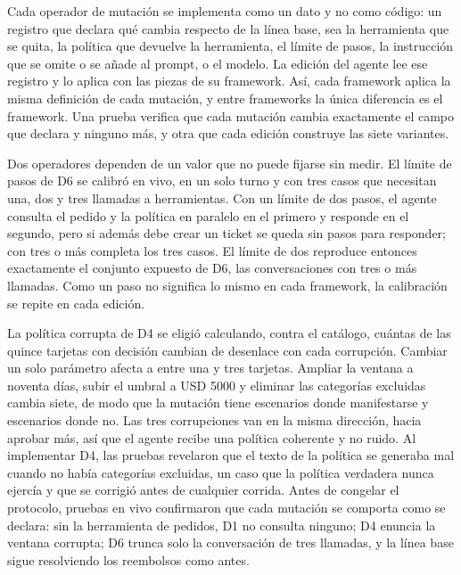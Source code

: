 Cada operador de mutación se implementa como un dato y no como código: un registro que declara qué cambia respecto de la línea base, sea la herramienta que se quita, la política que devuelve la herramienta, el límite de pasos, la instrucción que se omite o se añade al prompt, o el modelo. La edición del agente lee ese registro y lo aplica con las piezas de su framework. Así, cada framework aplica la misma definición de cada mutación, y entre frameworks la única diferencia es el framework. Una prueba verifica que cada mutación cambia exactamente el campo que declara y ninguno más, y otra que cada edición construye las siete variantes.
\par
Dos operadores dependen de un valor que no puede fijarse sin medir. El límite de pasos de D6 se calibró en vivo, en un solo turno y con tres casos que necesitan una, dos y tres llamadas a herramientas. Con un límite de dos pasos, el agente consulta el pedido y la política en paralelo en el primero y responde en el segundo, pero si además debe crear un ticket se queda sin pasos para responder; con tres o más completa los tres casos. El límite de dos reproduce entonces exactamente el conjunto expuesto de D6, las conversaciones con tres o más llamadas. Como un paso no significa lo mismo en cada framework, la calibración se repite en cada edición.
\par
La política corrupta de D4 se eligió calculando, contra el catálogo, cuántas de las quince tarjetas con decisión cambian de desenlace con cada corrupción. Cambiar un solo parámetro afecta a entre una y tres tarjetas. Ampliar la ventana a noventa días, subir el umbral a USD 5000 y eliminar las categorías excluidas cambia siete, de modo que la mutación tiene escenarios donde manifestarse y escenarios donde no. Las tres corrupciones van en la misma dirección, hacia aprobar más, así que el agente recibe una política coherente y no ruido. Al implementar D4, las pruebas revelaron que el texto de la política se generaba mal cuando no había categorías excluidas, un caso que la política verdadera nunca ejercía y que se corrigió antes de cualquier corrida. Antes de congelar el protocolo, pruebas en vivo confirmaron que cada mutación se comporta como se declara: sin la herramienta de pedidos, D1 no consulta ninguno; D4 enuncia la ventana corrupta; D6 trunca solo la conversación de tres llamadas, y la línea base sigue resolviendo los reembolsos como antes.
\par

